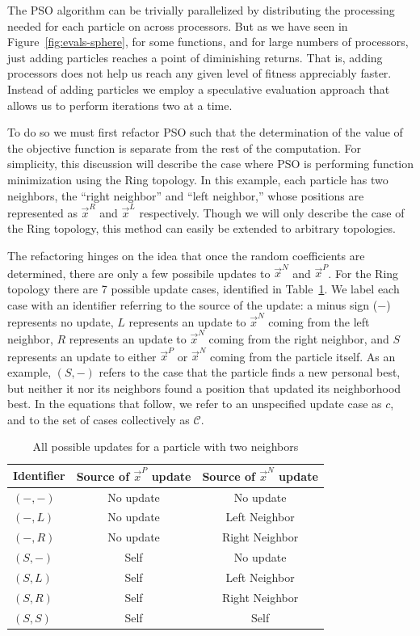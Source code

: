 \documentclass[journal,letterpaper]{IEEEtran}
\newcommand{\fig}[1]{Figure~\ref{fig:#1}}
\providecommand{\pers}{\ensuremath{P}}
\providecommand{\neigh}{\ensuremath{N}}
\providecommand{\leftind}{\ensuremath{L}}
\providecommand{\rightind}{\ensuremath{R}}
\providecommand{\nbest}{\ensuremath{\Vec{x}^\neigh}}
\providecommand{\pbest}{\ensuremath{\Vec{x}^\pers}}
\providecommand{\leftn}{\ensuremath{\Vec{x}^\leftind}}
\providecommand{\rightn}{\ensuremath{\Vec{x}^\rightind}}
\providecommand{\caseset}{\ensuremath{\mathcal{C}}}
\providecommand{\casegen}{\ensuremath{c}}
\providecommand{\casexn}{\ensuremath{(S,-)}}
\providecommand{\casexx}{\ensuremath{(S,S)}}
\providecommand{\casexl}{\ensuremath{(S,\leftind)}}
\providecommand{\casexr}{\ensuremath{(S,\rightind)}}
\providecommand{\casepn}{\ensuremath{(-,-)}}
\providecommand{\casepl}{\ensuremath{(-,\leftind)}}
\providecommand{\casepr}{\ensuremath{(-,\rightind)}}
\begin{document}
The PSO algorithm can be trivially parallelized by distributing the processing
needed for each particle on across processors.  But as we have seen in
\fig{evals-sphere}, for some functions, and for large numbers of
processors, just adding particles reaches a point of diminishing returns.
That is, adding processors does not help us reach any given level of fitness
appreciably faster.  Instead of adding particles we employ a speculative
evaluation approach that allows us to perform iterations two at a time.

To do so we must first refactor PSO such that the determination of the value
of the objective function is separate from the rest of the computation.  For
simplicity, this discussion will describe the case where PSO is performing
function minimization using the Ring topology.  In this example, each particle
has two neighbors, the ``right neighbor'' and ``left neighbor,'' whose
positions are represented as $\rightn$ and $\leftn$ respectively.  Though we
will only describe the case of the Ring topology, this method can easily be
extended to arbitrary topologies.

The refactoring hinges on the idea that once the random coefficients are
determined, there are only a few possibile updates to $\nbest$ and $\pbest$.
For the Ring topology there are 7 possible update cases, identified in
Table~\ref{tab:evals}.  We label each case with an identifier referring to the
source of the update: a minus sign ($-$) represents no update, $L$ represents
an update to $\nbest$ coming from the left neighbor, $R$ represents an update
to $\nbest$ coming from the right neighbor, and $S$ represents an update to
either $\pbest$ or $\nbest$ coming from the particle itself.  As an example,
$\casexn$ refers to the case that the particle finds a new personal best, but
neither it nor its neighbors found a position that updated its neighborhood
best.  In the equations that follow, we refer to an unspecified update case as
$\casegen$, and to the set of cases collectively as $\caseset$.

\begin{table}
  \caption{All possible updates for a particle with two neighbors}
  \label{tab:evals}
  \centering
  \begin{tabular}{lcc}
	Identifier&Source of $\pbest$ update&Source of $\nbest$ update\\
	\hline
	\hline
	$\casepn$&No update&No update\\
	\hline
	$\casepl$&No update&Left Neighbor\\
	\hline
	$\casepr$&No update&Right Neighbor\\
	\hline
	$\casexn$&Self&No update\\
	\hline
	$\casexl$&Self&Left Neighbor\\
	\hline
	$\casexr$&Self&Right Neighbor\\
	\hline
	$\casexx$&Self&Self\\
	\hline
  \end{tabular}
\end{table}
\end{document}
